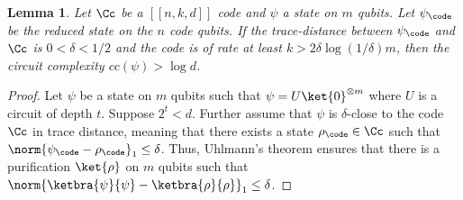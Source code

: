 \documentclass[11pt]{article}
\newtheorem{lemma}[theorem]{Lemma}
\begin{document}
%

\begin{lemma}
\label{lem:warmup-lemma}
Let $\Cc$ be a $[[n,k,d]]$ code and $\psi$ a state on $m$ qubits. Let $\psi_\code$ be the reduced state on the $n$ code qubits. If the trace-distance between $\psi_\code$ and $\Cc$ is $0 < \delta < 1/2$ and the code is of rate at least $k > 2 \delta \log(1/\delta) m$,
then the circuit complexity $cc(\psi) > \log d$.
\end{lemma}

\begin{proof}
Let $\psi$ be a state on $m$ qubits such that $\psi = U \ket{0}^{\otimes m}$ where $U$ is a circuit of depth $t$. Suppose $2^t<d$. Further assume that $\psi$ is $\delta$-close to the code $\Cc$ in trace distance, meaning that there exists a state $\rho_\code \in \Cc$ such that $\norm{\psi_{\code} - \rho_\code}_1 \leq \delta$. Thus, Uhlmann's theorem \cite{uhlmann76} ensures that there is a purification $\ket{\rho}$ on $m$ qubits such that $\norm{\ketbra{\psi}{\psi} - \ketbra{\rho}{\rho}}_1 \leq \delta$.



\end{proof}
\end{document}
